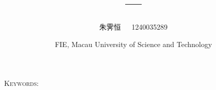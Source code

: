 \documentclass[twoside, a4paper, 12pt, scheme = plain]{ctexart}
\title{\vspace{-2em}\Huge \\
\vspace{0.38em}\Large ---\vspace{-1.0em}}
\author{\small 朱霁恒\ \ \ 1240035289}
\date{\vspace{-0.5em} \small FIE, Macau University of Science and Technology}
\begin{document}
\maketitle
\vspace{-2.5em}

\thispagestyle{myheader}

\begin{abstract}
\vspace{-0.5em}
\small

\end{abstract}

\vspace{-0.5em}

\noindent \textsc{Keywords:} 
\section{}
\section{}
\subsection{}
\subsection{}
\section{}
\subsection{}
\subsection{}
\section{}
\subsection{}
\subsection{}
\section{}
\end{document}
